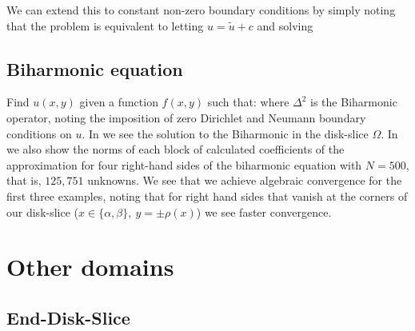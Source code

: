 
We can extend this to constant non-zero boundary conditions by simply noting that the problem 
is equivalent to letting $u = \tilde{u} + c$ and solving


\subsection{Biharmonic equation}

Find $u(x,y)$ given a function $f(x,y)$ such that:
where $\Delta^2$ is the Biharmonic operator, noting the imposition of zero Dirichlet and Neumann boundary conditions on $u$. In  we see the solution to the Biharmonic  in the disk-slice $\Omega$. In  we also show the norms of each block of calculated coefficients of the approximation for four right-hand sides of the biharmonic equation with $N = 500$, that is, $125,751$ unknowns.  We see that we achieve algebraic convergence for the first three examples, noting that for right hand sides that vanish at the corners of our disk-slice ($x\in\{\alpha,\beta\}, \: y = \pm \rho(x)$) we see faster convergence.


\section{Other domains}

\subsection{End-Disk-Slice}\label{section:ds:enddiskslice}

